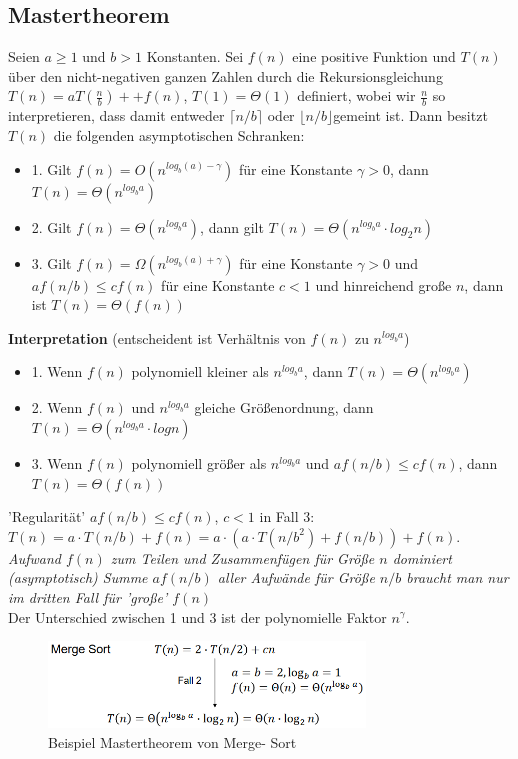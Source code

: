 \documentclass{article}
\begin{document}
        \subsection{Mastertheorem}
            Seien $a \geq 1$ und $b > 1$ Konstanten. Sei $f(n)$ eine positive Funktion und $T(n)$ über den nicht-negativen ganzen Zahlen durch die Rekursionsgleichung $T(n)=aT(\frac{n}{b})++f(n)$, $T(1)=\Theta(1)$ definiert, wobei wir $\frac{n}{b}$ so interpretieren, dass damit entweder $\lceil n/b \rceil$ oder $\lfloor n/b \rfloor$gemeint ist. Dann besitzt $T(n)$ die folgenden asymptotischen Schranken:\\
            \begin{itemize}
                \item 1. Gilt $f(n)=O(n^{log_b (a)-\gamma})$ für eine Konstante $\gamma >0$, dann $T(n)=\Theta(n^{log_b a})$
                \item 2. Gilt $f(n)=\Theta(n^{log_b a})$, dann gilt $T(n)=\Theta(n^{log_b a}\cdot log_2 n)$
                \item 3. Gilt $f(n)=\Omega(n^{log_b (a)+\gamma})$ für eine Konstante $\gamma >0$ und $af(n/b) \leq cf(n)$ für eine Konstante $c<1$ und hinreichend große $n$, dann ist $T(n)=\Theta(f(n))$
            \end{itemize}
            \textbf{Interpretation} (entscheident ist Verhältnis von $f(n)$ zu $n^{log_b a}$)
            \begin{itemize}
                \item 1. Wenn $f(n)$ polynomiell kleiner als $n^{log_b a}$, dann $T(n)=\Theta(n^{log_b a})$
                \item 2. Wenn $f(n)$ und $n^{log_b a}$ gleiche Größenordnung, dann $T(n)=\Theta(n^{log_b a}\cdot log n)$
                \item 3. Wenn $f(n)$ polynomiell größer als $n^{log_b a}$ und $af(n/b)\leq cf(n)$, dann $T(n)=\Theta(f(n))$
            \end{itemize}
            'Regularität' $af(n/b)\leq cf(n)$, $c<1$ in Fall 3: $T(n)=a\cdot T(n/b)+f(n)=a\cdot (a\cdot T(n/b^2)+f(n/b))+f(n)$.\\
            \textit{Aufwand $f(n)$ zum Teilen und Zusammenfügen für Größe $n$ dominiert (asymptotisch) Summe $af(n/b)$ aller Aufwände für Größe $n/b$ braucht man nur im dritten Fall für 'große' $f(n)$}\\
            Der Unterschied zwischen 1 und 3 ist der polynomielle Faktor $n^\gamma$.\\
            \begin{figure}[ht]
                \centering
                \includegraphics[width=0.75\textwidth]{Bilder/MTBsp.png}
                \caption{Beispiel Mastertheorem von Merge- Sort}
                \label{fig:MTBsp}
            \end{figure}
\end{document}
